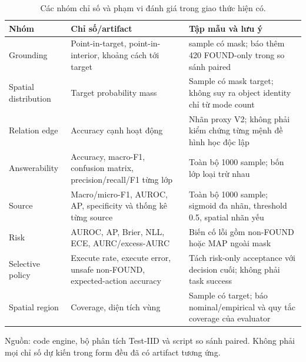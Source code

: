 \begin{table}[htbp]
    \centering
    \setlength{\tabcolsep}{4pt}
    \renewcommand{\arraystretch}{1.15}
    \caption{Các nhóm chỉ số và phạm vi đánh giá trong giao thức hiện có.}
    \label{tab:setup-metric-protocol}
    \small
    \begin{tabularx}{\textwidth}{@{}>{\raggedright\arraybackslash}p{}>{\raggedright\arraybackslash}p{}>{\raggedright\arraybackslash}X@{}}
        \toprule
        Nhóm & Chỉ số/artifact & Tập mẫu và lưu ý \\
        \midrule
        Grounding & Point-in-target, point-in-interior,
        khoảng cách tới target & 835 sample có mask;
        báo thêm 420 FOUND-only trong so sánh paired \\
        Spatial distribution & Target probability mass &
        Sample có mask target; không suy ra object identity
        chỉ từ mode count \\
        Relation edge & Accuracy cạnh hoạt động &
        Nhãn proxy V2; không phải kiểm chứng từng
        mệnh đề hình học độc lập \\
        Answerability & Accuracy, macro-F1, confusion
        matrix, precision/recall/F1 từng lớp & Toàn bộ
        1000 sample; bốn lớp loại trừ nhau \\
        Source & Macro/micro-F1, AUROC, AP, specificity
        và thống kê từng source & Toàn bộ 1000 sample;
        sigmoid đa nhãn, threshold 0.5, spatial nhãn yếu \\
        Risk & AUROC, AP, Brier, NLL, ECE,
        AURC/excess-AURC & Biến cố lỗi gồm non-FOUND
        hoặc MAP ngoài mask \\
        Selective policy & Execute rate, execute error,
        unsafe non-FOUND, expected-action accuracy &
        Tách risk-only acceptance với decision cuối;
        không phải task success \\
        Spatial region & Coverage, diện tích vùng &
        Sample có target; báo nominal/empirical
        và quy tắc coverage của evaluator \\
        \bottomrule
    \end{tabularx}
    \vspace{2pt}
    {\footnotesize\raggedright Nguồn: code engine, bộ phân tích Test-IID
    và script so sánh paired. Không phải mọi chỉ số
    dự kiến trong form đều đã có artifact tương ứng.\par}
\end{table}

